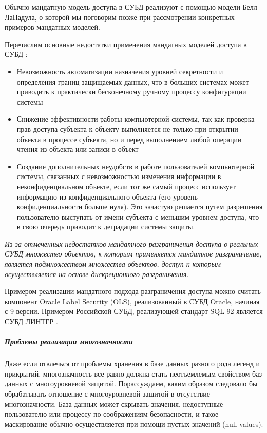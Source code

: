 {Обычно мандатную модель доступа в СУБД реализуют с помощью модели Белл-ЛаПадула, о которой мы поговорим позже 
при рассмотрении конкретных примеров мандатных моделей.

Перечислим основные недостатки применения мандатных моделей доступа в СУБД \autocite{Skakun}:
\begin{itemize}
    \item Невозможность автоматизации назначения уровней секретности и определения границ защищаемых данных, 
    что в больших системах может приводить к практически бесконечному ручному процессу конфигурации системы
    \item Снижение эффективности работы компьютерной системы, так как проверка прав доступа субъекта к объекту 
    выполняется не только при открытии объекта в процессе субъекта, но и перед выполнением любой операции 
    чтения из объекта или записи в объект
    \item Создание дополнительных неудобств в работе пользователей компьютерной системы, связанных с 
    невозможностью изменения информации в неконфиденциальном объекте, если тот же самый процесс использует 
    информацию из конфиденциального объекта (его уровень конфиденциальности больше нуля). Это зачастую
    решается путем разрешения пользователю выступать от имени субъекта с меньшим уровнем доступа, что в 
    свою очередь приводит к деградации системы защиты.
\end{itemize}

\textit{Из-за отмеченных недостатков мандатного разграничения доступа в реальных СУБД множество объектов, к которым 
применяется мандатное разграничение, является подмножеством множества объектов, доступ к которым осуществляется 
на основе дискреционного разграничения.}

Примером реализации мандатного подхода разграничения доступа можно считать компонент Oracle Label Security (OLS), 
реализованный в СУБД Oracle, начиная с 9 версии. Примером Российской СУБД, реализующей стандарт SQL-92 является 
СУБД ЛИНТЕР \autocite{Skakun}.

\subparagraph{Проблемы реализации многозначности}

Даже если отвлечься от проблемы хранения в базе данных разного рода легенд и прикрытий, многозначность все равно должна стать неотъемлемым свойством баз данных с многоуровневой защитой. Порассуждаем, каким образом следовало бы обрабатывать отношение с многоуровневой защитой в отсутствие многозначности. База данных может скрывать значения, недоступные пользователю или процессу по соображениям безопасности, и такое маскирование обычно осуществляется при помощи пустых значений (null values).

}
